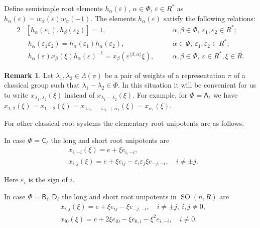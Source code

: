 \documentclass[12pt]{amsart}
\numberwithin{equation}{section}
\theoremstyle{definition}
\newtheorem{rem}[equation]{Remark}
\DeclareMathOperator{\SO}{SO}
\newcommand{\rA}{\mathsf{A}}
\newcommand{\rB}{\mathsf{B}}
\newcommand{\rC}{\mathsf{C}}
\newcommand{\rD}{\mathsf{D}}
\begin{document}
Define semisimple root elements $h_\alpha(\varepsilon)$, $\alpha\in\Phi$, $\varepsilon\in R^*$ as $h_\alpha(\varepsilon)=w_\alpha(\varepsilon)w_\alpha(-1)$.
The elements $h_\alpha(\varepsilon)$ satisfy the following relations:
\begin{alignat}{2}
& [ h_\alpha(\varepsilon_1), h_\beta(\varepsilon_2)] = 1, &\quad& \alpha, \beta \in \Phi,\ \varepsilon_1, \varepsilon_2 \in R^*; \label{rel:h-comm} \\
& \phantom{[} h_\alpha(\varepsilon_1 \varepsilon_2) = h_\alpha(\varepsilon_1) h_\alpha(\varepsilon_2), && \alpha \in \Phi,\ \varepsilon_1, \varepsilon_2 \in R^*; \label{rel:h-mult} \\
& \phantom{[} h_\alpha(\varepsilon)x_\beta(\xi)h_\alpha(\varepsilon)^{-1} = x_\beta\left(\varepsilon^{\langle\beta,\alpha\rangle}\xi\right), && \alpha, \beta \in \Phi,\ \varepsilon \in R^*, \xi \in R. \label{rel:h-w}
\end{alignat}

\begin{rem}
Let $\lambda_1, \lambda_2 \in \Lambda(\pi)$ be a pair of weights of a representation $\pi$ of a classical group such that $\lambda_1-\lambda_2\in \Phi$.
In this situation it will be convenient for us to write $x_{\lambda_1,\lambda_2}(\xi)$ instead of $x_{\lambda_1-\lambda_2}(\xi)$.
For example, for $\Phi=\rA_\ell$ we have $x_{1,2}(\xi)=x_{1-2}(\xi)=x_{\varpi_1 - \varpi_1 + \alpha_1}(\xi) = x_{\alpha_1}(\xi)$.
\end{rem}
For other classical root systems the elementary root unipotents are as follows.

In case $\Phi=\rC_\ell$ the long and short root unipotents are
\begin{align*}
& x_{i,-i}(\xi)=e+\xi e_{i,-i}, \\ 
& x_{i,j}(\xi)=e+\xi e_{ij}-\varepsilon_i\varepsilon_j\xi e_{-j,-i},\quad i\neq\pm j.
\end{align*}

Here $\varepsilon_i$ is the sign of $i$.

In case $\Phi=\rB_\ell,\rD_\ell$ the long and short root unipotents in $\SO(n,R)$ are
\begin{align*}
& x_{i,j}(\xi)=e+\xi e_{ij}-\xi e_{-j,-i},\quad i\neq\pm j,\ i,j\neq0, \\
& x_{i0}(\xi)=e+2\xi e_{i0}-\xi e_{0,i}-\xi^2 e_{i,-i},\quad i\neq0.
\end{align*}
\end{document}
